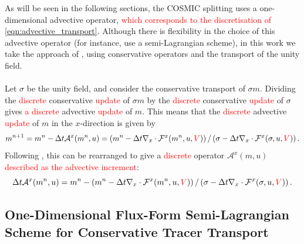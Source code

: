 \documentclass{ametsocV6.1}
\newcommand{\change}[1]{\textcolor{red}{#1}}
\begin{document}
As will be seen in the following sections, the COSMIC splitting uses a one-dimensional advective operator, \change{which corresponds to the discretisation of \eqref{eqn:advective_transport}}.
Although there is flexibility in the choice of this advective operator (for instance, \citet{lin1996ffsl} use a semi-Lagrangian scheme), in this work we take the approach of \citet{putman2007fvtransport}, using conservative operators and the transport of the unity field. \\
\\
Let $\sigma$ be the unity field, and consider the conservative transport of $\sigma m$.
Dividing the \change{discrete} conservative \change{update} of $\sigma m$ by the \change{discrete} conservative \change{update} of $\sigma$ gives \change{a discrete} advective \change{update} of $m$.
This means that the \change{discrete} advective \change{update} of $m$ in the $x$-direction is given by
\begin{equation} \label{eqn:one_d_advection_tracer_2}
m^{n+1} = m^{n} - \Delta{t} \mathcal{A}^x(m^n,u) = \left( m^n - \Delta{t} \nabla_x\cdot \mathcal{F}^x(m^n,u,\change{V})\right)/\left( \sigma - \Delta{t} \nabla_x\cdot \mathcal{F}^x(\sigma,u,\change{V})\right).
\end{equation}
Following \citet{putman2007fvtransport}, this can be rearranged to give a \change{discrete} operator $\mathcal{A}^x(m,u)$ \change{described as the advective increment}:
\begin{equation}
    \Delta{t} \mathcal{A}^x(m^n, u) = m^n - \left( m^n - \Delta{t} \nabla_x\cdot \mathcal{F}^x(m^n,u,\change{V})\right)/\left( \sigma - \Delta{t} \nabla_x\cdot \mathcal{F}^x(\sigma,u,\change{V})\right).
\end{equation}

\subsection{One-Dimensional Flux-Form Semi-Lagrangian Scheme for Conservative Tracer Transport} \label{sec:consistent_ffsl_1d}
\end{document}

